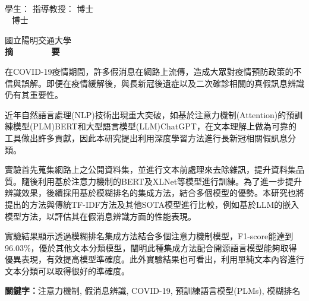 
  \begin{center}
	\large
    \begin{singlespace}    
      \textbf{\chineseTitle{}} \\[0.5cm]
    \end{singlespace}
    
    \begin{singlespace}    

    學生：\studentCnName  \hspace{2.5cm}  指導教授：\advisorCnName \hspace{0.1cm} 博士 \\
    \ifdefined\advisorCnNameB %
    \hspace{8cm}  \advisorCnNameB ~ 博士 \\
    \fi
    \end{singlespace}

    \vspace{0.5cm}

    國立陽明交通大學\ \DepartInstitCnName\ \iftoggle{iamphd}{博士班}{碩士班} \\[0.5cm]
    \textbf{摘~~~~~~~~要} \\[0.5cm]

  \end{center}
  \normalsize 

在COVID-19疫情期間，許多假消息在網路上流傳，造成大眾對疫情預防政策的不信與誤解。即便在疫情緩解後，與長新冠後遺症以及二次確診相關的真假訊息辨識仍有其重要性。

近年自然語言處理(NLP)技術出現重大突破，如基於注意力機制(Attention)的預訓練模型(PLM)BERT和大型語言模型(LLM)ChatGPT，在文本理解上做為可靠的工具做出許多貢獻，因此本研究提出利用深度學習方法進行長新冠相關假訊息分類。

實驗首先蒐集網路上之公開資料集，並進行文本前處理來去除雜訊，提升資料集品質。隨後利用基於注意力機制的BERT及XLNet等模型進行訓練。為了進一步提升辨識效果，後續採用基於模糊排名的集成方法，結合多個模型的優勢。本研究也將提出的方法與傳統TF-IDF方法及其他SOTA模型進行比較，例如基於LLM的嵌入模型方法，以評估其在假消息辨識方面的性能表現。

實驗結果顯示透過模糊排名集成方法結合多個注意力機制模型，F1-score能達到96.03\%，優於其他文本分類模型，闡明此種集成方法配合開源語言模型能夠取得優異表現，有效提高模型準確度。此外實驗結果也可看出，利用單純文本內容進行文本分類可以取得很好的準確度。

  \vspace{1cm}

  \textbf{關鍵字：}注意力機制, 假消息辨識,  COVID-19,  預訓練語言模型(PLMs), 模糊排名